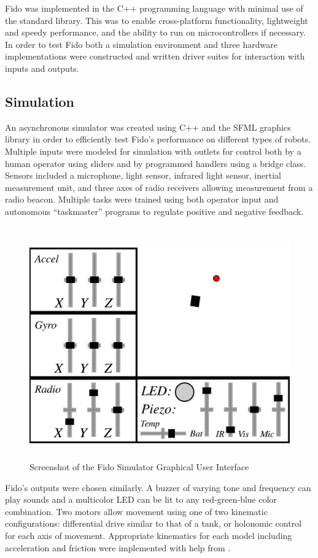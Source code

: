 Fido was implemented in the C++ programming language with minimal use of the standard library.
This was to enable cross-platform functionality, lightweight and speedy performance, and the ability to run on microcontrollers if necessary.
In order to test Fido both a simulation environment and three hardware implementations were constructed and written driver suites for interaction with inputs and outputs.

\subsection{Simulation}

An asynchronous simulator was created using C++ and the SFML graphics library in order to efficiently test Fido's performance on different types of robots.
Multiple inputs were modeled for simulation with outlets for control both by a human operator using sliders and by programmed handlers using a bridge class.
Sensors included a microphone, light sensor, infrared light sensor, inertial measurement unit, and three axes of radio receivers allowing measurement from a radio beacon.
Multiple tasks were trained using both operator input and autonomous ``taskmaster'' programs to regulate positive and negative feedback.


\begin{figure}[H]
	\centering
	\includegraphics[height=10cm]{Figures/Screenshot.png}
	\caption{Screenshot of the Fido Simulator Graphical User Interface}
\end{figure}

Fido's outputs were chosen similarly.
A buzzer of varying tone and frequency can play sounds and a multicolor LED can be lit to any red-green-blue color combination.
Two motors allow movement using one of two kinematic configurations: differential drive similar to that of a tank, or holonomic control for each axis of movement.
Appropriate kinematics for each model including acceleration and friction were implemented with help from \cite{dudek}.

